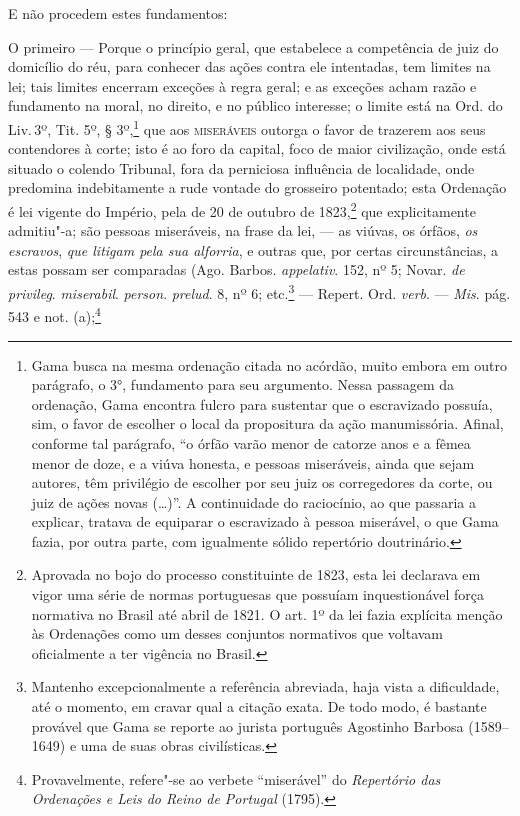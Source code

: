 E não procedem estes fundamentos:

O primeiro --- Porque o princípio geral, que estabelece a competência
de juiz do domicílio do réu, para conhecer das ações contra ele
intentadas, tem limites na lei; tais limites encerram exceções à regra
geral; e as exceções acham razão e fundamento na moral, no direito, e no
público interesse; o limite está na Ord. do Liv.\,3º, Tit. 5º, §
3º,\footnote{Gama busca na mesma ordenação citada no acórdão, muito
  embora em outro parágrafo, o 3°, fundamento para seu argumento. Nessa
  passagem da ordenação, Gama encontra fulcro para sustentar que o
  escravizado possuía, sim, o favor de escolher o local da propositura
  da ação manumissória. Afinal, conforme tal parágrafo, ``o órfão varão
  menor de catorze anos e a fêmea menor de doze, e a viúva honesta, e
  pessoas miseráveis, ainda que sejam autores, têm privilégio de
  escolher por seu juiz os corregedores da corte, ou juiz de ações novas
  (\ldots{})''. A continuidade do raciocínio, ao que passaria a explicar,
  tratava de equiparar o escravizado à pessoa miserável, o que Gama
  fazia, por outra parte, com igualmente sólido repertório doutrinário.}
que aos \textsc{miseráveis} outorga o favor de trazerem aos seus contendores à
corte; isto é ao foro da capital, foco de maior civilização, onde está
situado o colendo Tribunal, fora da perniciosa influência de localidade,
onde predomina indebitamente a rude vontade do grosseiro potentado; esta
Ordenação é lei vigente do Império, pela de 20 de outubro de
1823,\footnote{Aprovada no bojo do processo constituinte de 1823, esta
  lei declarava em vigor uma série de normas portuguesas que possuíam
  inquestionável força normativa no Brasil até abril de 1821. O art. 1º
  da lei fazia explícita menção às Ordenações como um desses conjuntos
  normativos que voltavam oficialmente a ter vigência no Brasil.} que
explicitamente admitiu"-a; são pessoas miseráveis, na frase da lei, ---
as viúvas, os órfãos, \emph{os escravos}, \emph{que litigam pela sua
alforria}, e outras que, por certas circunstâncias, a estas possam ser
comparadas (Ago. Barbos. \emph{appelativ}. 152, nº 5; Novar. \emph{de
privileg}. \emph{miserabil}. \emph{person}. \emph{prelud}. 8, nº 6;
etc.\footnote{Mantenho excepcionalmente a referência abreviada, haja
  vista a dificuldade, até o momento, em cravar qual a citação exata. De
  todo modo, é bastante provável que Gama se reporte ao jurista
  português Agostinho Barbosa (1589--1649) e uma de suas obras
  civilísticas.} --- Repert. Ord. \emph{verb}. --- \emph{Mis}. pág. 543 e
not. (a);\footnote{Provavelmente, refere"-se ao verbete ``miserável'' do
  \emph{Repertório das Ordenações e Leis do Reino de Portugal} (1795).}
